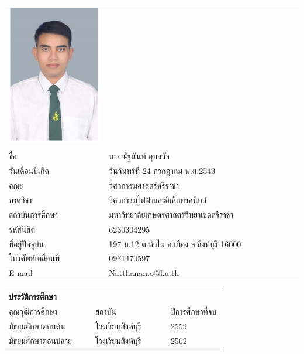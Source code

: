 \pagebreak
{}
\begin{center}
\begin{longtable}{@{}p{0.34\linewidth}@{}p{0.66\linewidth}@{}}
\includegraphics[scale=0.8,valign=c]{Chapters/img/nisit img/6230304295.PNG} & \\
    &\\
	ชื่อ							& นายณัฐนันท์ อุบลวัจ\\
	วันเดือนปีเกิด						& วันจันทร์ที่ 24 กรกฎาคม พ.ศ.2543\\
	คณะ							& วิศวกรรมศาสตร์ศรีราชา\\
	ภาควิชา							& วิศวกรรมไฟฟ้าและอิเล็กทรอนิกส์\\
	สถาบันการศึกษา						& มหาวิทยาลัยเกษตรศาสตร์วิทยาเขตศรีราชา\\
	รหัสนิสิต						& 6230304295\\
	ที่อยู่ปัจจุบัน						& 197 ม.12 ต.หัวไผ่ อ.เมือง จ.สิงห์บุรี 16000\\
	โทรศัพท์เคลื่อนที่					& 0931470597\\
	E-mail						& Natthanan.o@ku.th\\
\end{longtable}

\begin{longtable}{@{}p{0.4\linewidth}@{}p{0.35\linewidth}@{}p{0.25\linewidth}}
	\textbf{ประวัติการศึกษา} & &\\
	คุณวุฒิการศึกษา		&	สถาบัน				&	ปีการศึกษาที่จบ \\\hline
	มัธยมศึกษาตอนต้น	&	โรงเรียนสิงห์บุรี	&	2559 	\\
	มัธยมศึกษาตอนปลาย	&	โรงเรียนสิงห์บุรี	&	2562 	\\
\end{longtable}
\end{center}
